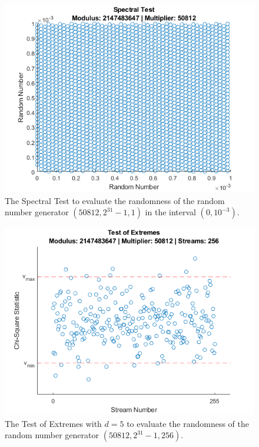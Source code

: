 \begin{figure}
	\label{fig:evaluation-randomness-spectral-50812}
	\includegraphics[width=\columnwidth]{fig/evaluation-randomness-spectral-50812}
	\caption{The Spectral Test to evaluate the randomness of the random number generator $(50812,2^{31}-1, 1)$ in the interval $(0, 10^{-3})$.}
\end{figure}

\begin{figure}
	\label{fig:evaluation-randomness-extremes-50812}
	\includegraphics[width=\columnwidth]{fig/evaluation-randomness-extremes-50812}
	\caption{The Test of Extremes with $d=5$ to evaluate the randomness of the random number generator $(50812,2^{31}-1, 256)$.}
\end{figure}

